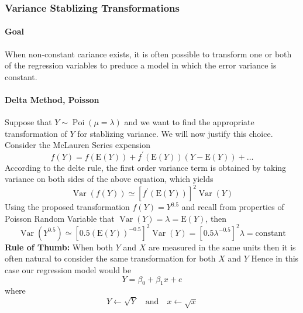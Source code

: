\documentclass[11pt]{article}
\begin{document}
\subsubsection{Variance Stablizing Transformations}
\paragraph{Goal} When non-constant cariance exists, it is often possible to transform one or both of the regression variables to preduce a model in which the error variance is constant. 

\paragraph{Delta Method, Poisson} Suppose that $Y\sim \operatorname{Poi}(\mu = \lambda)$ and we want to find the appropriate transformation of $Y$ for stablizing variance. \color{Thistle}{In this case, square root is the appropriate transformation to apply.} \color{Black} We will now justify this choice. Consider the McLauren Series expension
\begin{equation*}
    f(Y)=f(\mathrm{E}(Y))+f^{\prime}(\mathrm{E}(Y))(Y-\mathrm{E}(Y))+\ldots
\end{equation*}
According to the delte rule, the first order variance term is obtained by taking variance on both sides of the above equation, which yields
\begin{equation*}
    \operatorname{Var}(f(Y)) \simeq\left[f^{\prime}(\mathrm{E}(Y))\right]^{2} \operatorname{Var}(Y)
\end{equation*}
Using the proposed transformation $f(Y)=Y^{0.5}$ and recall from properties of Poisson Random Variable that $\operatorname{Var}(Y)=\lambda=\mathrm{E}(Y)$, then
\begin{equation*}
    \operatorname{Var}\left(Y^{0.5}\right) \simeq\left[0.5(\mathrm{E}(Y))^{-0.5}\right]^{2} \operatorname{Var}(Y)=\left[0.5 \lambda^{-0.5}\right]^{2} \lambda=\mathrm{constant}
\end{equation*}
\color{Thistle} \textbf{Rule of Thumb:} When both $Y$ and $X$ are measured in the same units then it is often natural to consider the same transformation for both $X$ and $Y$ \color{Black} \newline \newline
Hence in this case our regression model would be
\begin{equation*}
    Y=\beta_{0}+\beta_{1} x+e
\end{equation*}
where
\begin{equation*}
    Y \gets \sqrt{Y} \quad \text{and} \quad x \gets \sqrt{x}
\end{equation*}
\end{document}
